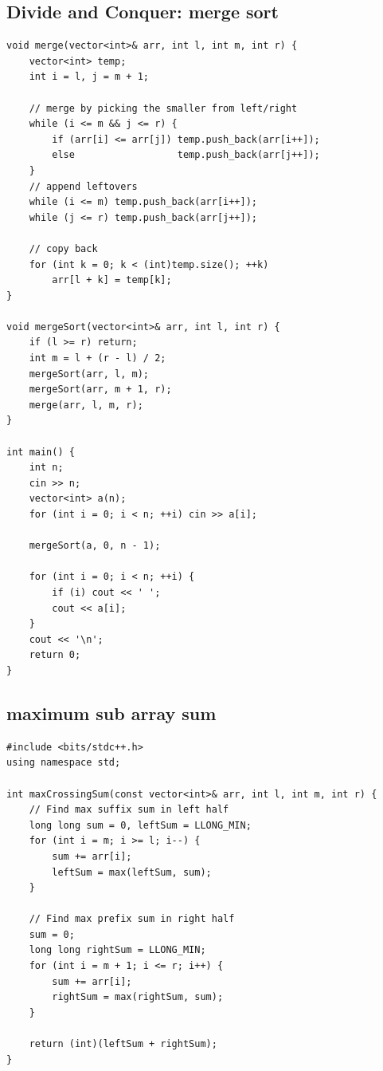 \documentclass[a4paper,10pt,oneside]{article}
\begin{document}
\begin{multicols*}{\COLS}
\begin{lstlisting}
\end{lstlisting}


\subsection{Divide and Conquer: merge sort }
\begin{lstlisting}
void merge(vector<int>& arr, int l, int m, int r) {
    vector<int> temp;
    int i = l, j = m + 1;

    // merge by picking the smaller from left/right
    while (i <= m && j <= r) {
        if (arr[i] <= arr[j]) temp.push_back(arr[i++]);
        else                  temp.push_back(arr[j++]);
    }
    // append leftovers
    while (i <= m) temp.push_back(arr[i++]);
    while (j <= r) temp.push_back(arr[j++]);

    // copy back
    for (int k = 0; k < (int)temp.size(); ++k)
        arr[l + k] = temp[k];
}

void mergeSort(vector<int>& arr, int l, int r) {
    if (l >= r) return;
    int m = l + (r - l) / 2;
    mergeSort(arr, l, m);
    mergeSort(arr, m + 1, r);
    merge(arr, l, m, r);
}

int main() {
    int n; 
    cin >> n;
    vector<int> a(n);
    for (int i = 0; i < n; ++i) cin >> a[i];

    mergeSort(a, 0, n - 1);

    for (int i = 0; i < n; ++i) {
        if (i) cout << ' ';
        cout << a[i];
    }
    cout << '\n';
    return 0;
}

\end{lstlisting}
\subsection{maximum sub array sum}
\begin{lstlisting}
#include <bits/stdc++.h>
using namespace std;

int maxCrossingSum(const vector<int>& arr, int l, int m, int r) {
    // Find max suffix sum in left half
    long long sum = 0, leftSum = LLONG_MIN;
    for (int i = m; i >= l; i--) {
        sum += arr[i];
        leftSum = max(leftSum, sum);
    }

    // Find max prefix sum in right half
    sum = 0;
    long long rightSum = LLONG_MIN;
    for (int i = m + 1; i <= r; i++) {
        sum += arr[i];
        rightSum = max(rightSum, sum);
    }

    return (int)(leftSum + rightSum);
}


\end{lstlisting}
\end{multicols*}
\end{document}
